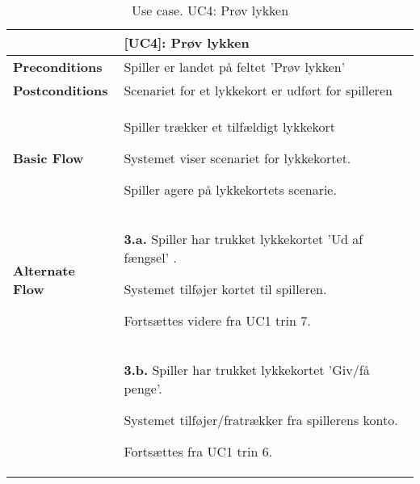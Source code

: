 \documentclass[class=article, crop=false]{standalone}
\begin{document}
    \begin{table}[H]
        \caption{Use case. UC4: Prøv lykken}
        \begin{tabularx}{\textwidth}{|l|X|}
            \hline
            & \textbf{[UC4]: Prøv lykken}   \\ \hline
            \textbf{Preconditions}       & Spiller er landet på feltet 'Prøv lykken'\\ \hline
            \textbf{Postconditions}      & Scenariet for et lykkekort er udført for spilleren\\ \hline


            \textbf{Basic Flow} & \begin{tabenum}
                                      \item Spiller trækker et tilfældigt lykkekort
                                      \item Systemet viser scenariet for lykkekortet.
                                      \item Spiller agere på lykkekortets scenarie.
            \end{tabenum}   \\ \hline




            \textbf{Alternate Flow}   & \textbf{3.a.} Spiller har trukket lykkekortet 'Ud af fængsel' .
            \begin{enumerate} \begin{tabenum}
                                  \item Systemet tilføjer kortet til spilleren.
                                  \item Fortsættes videre fra UC1 trin 7.
            \end{tabenum} \end{enumerate}
            \\


                               & \textbf{3.b.} Spiller har trukket lykkekortet 'Giv/få penge'.
            \begin{enumerate} \begin{tabenum}
                                  \item Systemet tilføjer/fratrækker fra spillerens konto.
                                  \item Fortsættes fra UC1 trin 6.
            \end{tabenum} \end{enumerate}
            \\


\end{tabularx}
\end{table}
\end{document}
